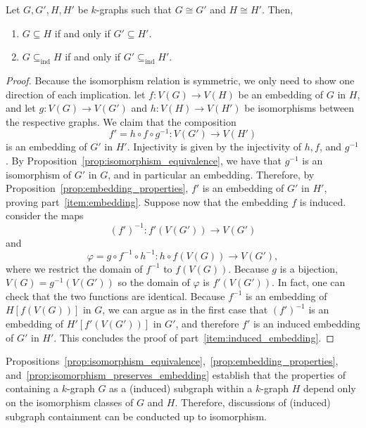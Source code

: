 \begin{proposition} \label{prop:isomorphism_preserves_embedding}
    Let $G, G', H, H'$ be $k$-graphs such that $G \cong G'$ and $H \cong H'$.
    Then,
    \begin{enumerate}
        \item $G \subseteq H$ if and only if $G' \subseteq H'$. \label{item:embedding}
        \item $G \subseteq_{\text{ind}} H$ if and only if $G' \subseteq_{\text{ind}} H'$. \label{item:induced_embedding}
    \end{enumerate}
    \begin{proof}
        Because the isomorphism relation is symmetric, we only need to show one direction of each implication.
        let $f: V(G) \to V(H)$ be an embedding of $G$ in $H$, and let
        $g: V(G) \to V(G')$ and $h: V(H) \to V(H')$ be isomorphisms between the respective graphs.
        We claim that the composition
        \[
            f' = h \circ f \circ g^{-1}: V(G') \to V(H')
        \]
        is an embedding of $G'$ in $H'$.
        Injectivity is given by the injectivity of $h, f$, and $g^{-1}$.
        By Proposition~\ref{prop:isomorphism_equivalence}, we have that $g^{-1}$ is an isomorphism of $G'$ in $G$,
        and in particular an embedding.
        Therefore, by Proposition~\ref{prop:embedding_properties},
        $f'$ is an embedding of $G'$ in $H'$, proving part~\eqref{item:embedding}.
        Suppose now that the embedding $f$ is induced.
        consider the maps
        \[
            (f')^{-1}: f'(V(G')) \to V(G')
        \]
        and
        \[
            \varphi = g \circ f^{-1} \circ h^{-1}: h \circ f(V(G)) \to V(G'),
        \]
        where we restrict the domain of $f^{-1}$ to $f(V(G))$.
        Because $g$ is a bijection, $V(G) = g^{-1}(V(G'))$ so the
        domain of $\varphi$ is $f'(V(G'))$.
        In fact, one can check that the two functions are identical.
        Because $f^{-1}$ is an embedding of $H[f(V(G))]$ in $G$,
        we can argue as in the first case that
        $(f')^{-1}$ is an embedding of $H'[f'(V(G'))]$ in $G'$,
        and therefore $f'$ is an induced embedding of $G'$ in $H'$.
        This concludes the proof of part~\eqref{item:induced_embedding}.
    \end{proof}
\end{proposition}

Propositions~\ref{prop:isomorphism_equivalence},~\ref{prop:embedding_properties},
and~\ref{prop:isomorphism_preserves_embedding}
establish that the properties of containing a $k$-graph $G$ as a (induced)
subgraph within a $k$-graph $H$ depend only on the isomorphism classes of $G$ and $H$.
Therefore, discussions of (induced) subgraph containment can be conducted up to isomorphism.

